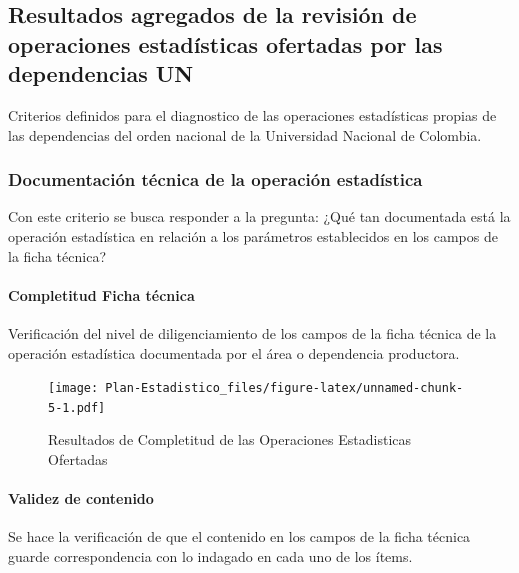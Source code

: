 \documentclass[
]{book}
\begin{document}
\hypertarget{resultados-agregados-de-la-revisiuxf3n-de-operaciones-estaduxedsticas-ofertadas-por-las-dependencias-un}{%
\subsection{Resultados agregados de la revisión de operaciones estadísticas ofertadas por las dependencias UN}\label{resultados-agregados-de-la-revisiuxf3n-de-operaciones-estaduxedsticas-ofertadas-por-las-dependencias-un}}

Criterios definidos para el diagnostico de las operaciones estadísticas propias de las dependencias
del orden nacional de la Universidad Nacional de Colombia.

\hypertarget{documentaciuxf3n-tuxe9cnica-de-la-operaciuxf3n-estaduxedstica}{%
\subsubsection{Documentación técnica de la operación estadística}\label{documentaciuxf3n-tuxe9cnica-de-la-operaciuxf3n-estaduxedstica}}

Con este criterio se busca responder a la pregunta: ¿Qué tan documentada está la operación estadística en relación a los parámetros establecidos en los campos de la ficha técnica?

\hypertarget{completitud-ficha-tuxe9cnica}{%
\paragraph{Completitud Ficha técnica}\label{completitud-ficha-tuxe9cnica}}

Verificación del nivel de diligenciamiento de los campos de la ficha técnica de la operación estadística documentada por el área o dependencia productora.

\begin{figure}
\centering
\texttt{[image: Plan-Estadistico\_files/figure-latex/unnamed-chunk-5-1.pdf]}
\caption{\label{fig:unnamed-chunk-5}Resultados de Completitud de las Operaciones Estadisticas Ofertadas}
\end{figure}

\hypertarget{validez-de-contenido}{%
\paragraph{Validez de contenido}\label{validez-de-contenido}}

Se hace la verificación de que el contenido en los campos de la ficha técnica guarde correspondencia con lo indagado en cada uno de los ítems.
\end{document}

